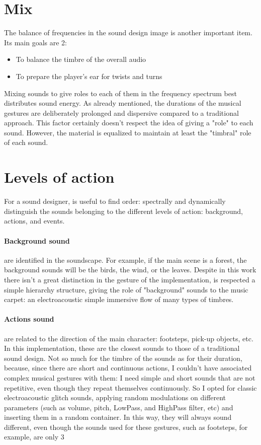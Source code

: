 \section{Mix}
The balance of frequencies in the sound design image is another important item. Its main goals are 2:

\begin{itemize}
	\item To balance the timbre of the overall audio
	\item To prepare the player's ear for twists and turns
\end{itemize}

Mixing sounds to give roles to each of them in the frequency spectrum best distributes sound energy.
As already mentioned, the durations of the musical gestures are deliberately prolonged and dispersive compared to a traditional approach. This factor certainly doesn't respect the idea of ​​giving a "role" to each sound. However, the material is equalized to maintain at least the "timbral" role of each sound.

\section{Levels of action}
For a sound designer, is useful to find order: spectrally and dynamically distinguish the sounds belonging to the different levels of action: background, actions, and events.

\paragraph{Background sound} are identified in the soundscape. For example, if the main scene is a forest, the background sounds will be the birds, the wind, or the leaves. Despite in this work there isn't a great distinction in the gesture of the implementation, is respected a simple hierarchy structure, giving the role of "background" sounds to the music carpet: an electroacoustic simple immersive flow of many types of timbres.

\paragraph{Actions sound} are related to the direction of the main character: footsteps, pick-up objects, etc. In this implementation, these are the closest sounds to those of a traditional sound design. Not so much for the timbre of the sounds as for their duration, because, since there are short and continuous actions, I couldn't have associated complex musical gestures with them: I need simple and short sounds that are not repetitive, even though they repeat themselves continuously. So I opted for classic electroacoustic glitch sounds, applying random modulations on different parameters (such as volume, pitch, LowPass, and HighPass filter, etc) and inserting them in a random container. In this way, they will always sound different, even though the sounds used for these gestures, such as footsteps, for example, are only 3
